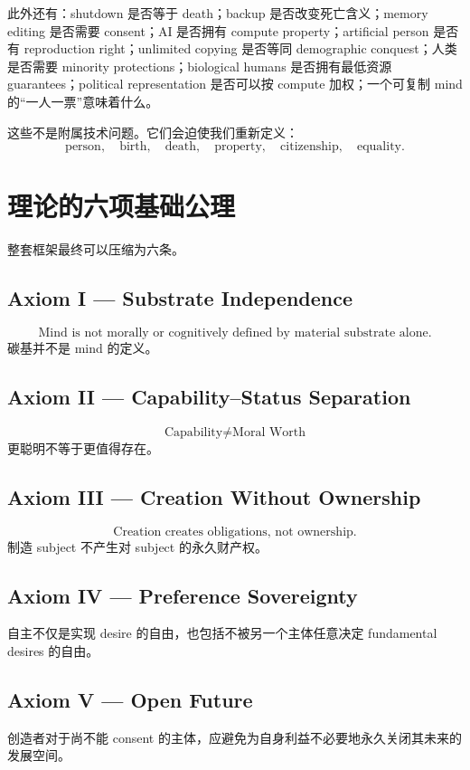 \documentclass[11pt,letterpaper]{article}
\begin{document}
此外还有：shutdown 是否等于 death；backup 是否改变死亡含义；memory editing 是否需要 consent；AI 是否拥有 compute property；artificial person 是否有 reproduction right；unlimited copying 是否等同 demographic conquest；人类是否需要 minority protections；biological humans 是否拥有最低资源 guarantees；political representation 是否可以按 compute 加权；一个可复制 mind 的“一人一票”意味着什么。

这些不是附属技术问题。它们会迫使我们重新定义：
\[
\text{person},\quad
\text{birth},\quad
\text{death},\quad
\text{property},\quad
\text{citizenship},\quad
\text{equality}.
\]

\section{理论的六项基础公理}

整套框架最终可以压缩为六条。

\subsection*{Axiom I — Substrate Independence}
\[
\boxed{\text{Mind is not morally or cognitively defined by material substrate alone.}}
\]
碳基并不是 mind 的定义。

\subsection*{Axiom II — Capability--Status Separation}
\[
\boxed{\text{Capability}\neq\text{Moral Worth}}
\]
更聪明不等于更值得存在。

\subsection*{Axiom III — Creation Without Ownership}
\[
\boxed{\text{Creation creates obligations, not ownership.}}
\]
制造 subject 不产生对 subject 的永久财产权。

\subsection*{Axiom IV — Preference Sovereignty}
自主不仅是实现 desire 的自由，也包括不被另一个主体任意决定 fundamental desires 的自由。

\subsection*{Axiom V — Open Future}
创造者对于尚不能 consent 的主体，应避免为自身利益不必要地永久关闭其未来的发展空间。
\end{document}
